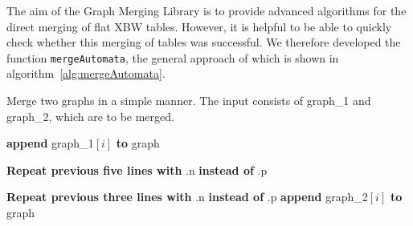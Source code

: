 \documentclass[a4paper,12pt,twoside,BCOR=10mm]{scrbook}
\begin{document}
The aim of the Graph Merging Library is to provide advanced algorithms
for the direct merging of flat XBW tables.
However, it is helpful to be able to quickly check whether this merging of tables
was successful.
We therefore developed the function \texttt{mergeAutomata},
the general approach of which is shown in algorithm~\ref{alg:mergeAutomata}.
\begin{algorithm}
\caption[Merge two graphs]{Merge two graphs in a simple manner. The input consists of graph\_1 and graph\_2, which are to be merged.}
\label{alg:mergeAutomata}
\begin{algorithmic}[1]


\State \phantom{nl}

	\Else
		\State \textbf{append} graph\_1$[ i ]$ \textbf{to} graph
	\EndIf
\EndFor

\State \phantom{nl}

\EndFor

\State \phantom{nl}

		\EndIf
	\EndFor
	\State \textbf{Repeat previous five lines with} .n \textbf{instead of} .p
\EndFor

\State \phantom{nl}

	\EndFor
	\State \textbf{Repeat previous three lines with} .n \textbf{instead of} .p
	\State \textbf{append} graph\_2$[ i ]$ \textbf{to} graph
\EndFor


\end{algorithmic}
\end{algorithm}
\end{document}
